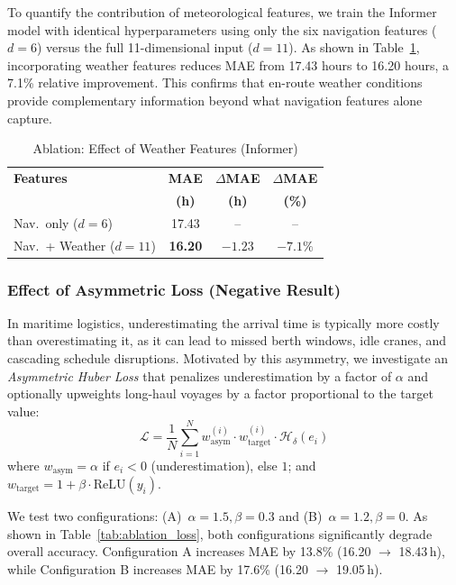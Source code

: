 \documentclass[conference]{IEEEtran}
\begin{document}
To quantify the contribution of meteorological features, we train the Informer model with identical hyperparameters using only the six navigation features ($d = 6$) versus the full 11-dimensional input ($d = 11$).
As shown in Table~\ref{tab:ablation_weather}, incorporating weather features reduces MAE from 17.43 hours to 16.20 hours, a 7.1\% relative improvement.
This confirms that en-route weather conditions provide complementary information beyond what navigation features alone capture.

\begin{table}[t]
    \centering
    \caption{Ablation: Effect of Weather Features (Informer)}
    \label{tab:ablation_weather}
    \footnotesize
    \begin{tabular}{lccc}
        \toprule
        \textbf{Features} & \textbf{MAE} & $\Delta$\textbf{MAE} & $\Delta$\textbf{MAE} \\
        & \textbf{(h)} & \textbf{(h)} & \textbf{(\%)} \\
        \midrule
        Nav.\ only ($d=6$) & 17.43 & -- & -- \\
        Nav.\ + Weather ($d=11$) & \textbf{16.20} & $-1.23$ & $-7.1\%$ \\
        \bottomrule
    \end{tabular}
\end{table}

\subsubsection{Effect of Asymmetric Loss (Negative Result)}
\label{sec:ablation_loss}

In maritime logistics, underestimating the arrival time is typically more costly than overestimating it, as it can lead to missed berth windows, idle cranes, and cascading schedule disruptions.
Motivated by this asymmetry, we investigate an \textit{Asymmetric Huber Loss} that penalizes underestimation by a factor of $\alpha$ and optionally upweights long-haul voyages by a factor proportional to the target value:
\begin{equation}
    \mathcal{L} = \frac{1}{N} \sum_{i=1}^{N} w_{\text{asym}}^{(i)} \cdot w_{\text{target}}^{(i)} \cdot \mathcal{H}_\delta(e_i)
    \label{eq:loss}
\end{equation}
where $w_{\text{asym}} = \alpha$ if $e_i < 0$ (underestimation), else $1$; and $w_{\text{target}} = 1 + \beta \cdot \text{ReLU}(y_i)$.

We test two configurations: (A)~$\alpha{=}1.5, \beta{=}0.3$ and (B)~$\alpha{=}1.2, \beta{=}0$.
As shown in Table~\ref{tab:ablation_loss}, both configurations significantly degrade overall accuracy.
Configuration A increases MAE by 13.8\% (16.20 $\to$ 18.43\,h), while Configuration B increases MAE by 17.6\% (16.20 $\to$ 19.05\,h).
\end{document}
